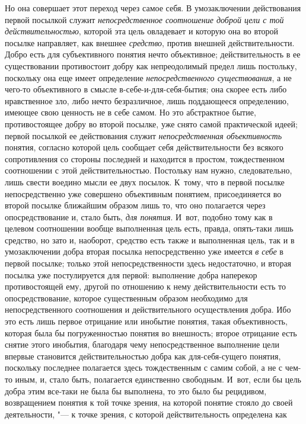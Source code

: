 {{Но она совершает этот переход через самое себя. В
умозаключении действования первой посылкой служит
{\em непосредственное соотношение доброй
цели с той действительностью}, которой эта цель овладевает и
которую она во второй посылке направляет, как внешнее
{\em средство}, против
внешней действительности. Добро есть для субъективного понятия нечто
объективное; действительность в ее существовании противостоит добру как
непреодолимый предел лишь постольку, поскольку она еще имеет определение
{\em непосредственного существования},
а не чего-то объективного в смысле в-себе-и-для-себя-бытия;
она скорее есть либо нравственное зло, либо нечто безразличное, лишь
поддающееся определению, имеющее свою ценность не в себе самом. Но это
абстрактное бытие, противостоящее добру во второй посылке,
уже снято самой практической идеей; первой посылкой ее действования служит
{\em непосредственная объективность}
понятия, согласно которой цель сообщает себя действительности
без всякого сопротивления со стороны последней и находится в простом,
тождественном соотношении с этой действительностью. Постольку нам нужно,
следовательно, лишь свести воедино мысли ее двух посылок. К~тому, что в
первой посылке непосредственно уже совершено объективным понятием,
присоединяется во второй посылке ближайшим образом лишь то, что оно
полагается через опосредствование и, стало быть,
{\em для понятия}. И~вот,
подобно тому как в целевом соотношении вообще выполненная цель есть,
правда, опять-таки лишь средство, но зато и, наоборот, средство есть также
и выполненная цель, так и в умозаключении добра вторая посылка
непосредственно уже имеется {\em в
себе} в первой посылке; только этой непосредственности здесь
недостаточно, и вторая посылка уже постулируется для первой: выполнение
добра наперекор противостоящей ему, другой по отношению к нему
действительности есть то опосредствование, которое существенным образом
необходимо для непосредственного соотношения и действительного
осуществления добра. Ибо это есть лишь первое отрицание или инобытие
понятия, такая объективность, которая была бы погруженностью понятия во
внешность; второе отрицание есть снятие этого инобытия, благодаря чему
непосредственное выполнение цели впервые становится действительностью добра
как для-себя-сущего понятия, поскольку последнее полагается здесь
тождественным с самим собой, а не с чем-то иным, и, стало быть,
полагается единственно свободным. И~вот, если бы цель добра этим все-таки
не была бы выполнена, то это было бы рецидивом, возвращением понятия к той
точке зрения, на которой понятие стояло до своей деятельности, "---
к точке зрения, с которой действительность определена как
}}
